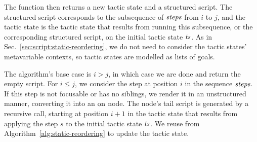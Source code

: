 The  function then returns a new tactic state and a structured script.
The structured script corresponds to the subsequence of ${\operatorname{\mathit{steps}}}$ from $i$ to $j$, and the tactic state is the tactic state that results from running this subsequence, or the corresponding structured script, on the initial tactic state ${\operatorname{\mathit{ts}}}$.
As in Sec.~\ref{sec:script:static-reordering}, we do not need to consider the tactic states' metavariable contexts, so tactic states are modelled as lists of goals.

\begin{algorithm}
  \BlankLine
  \BlankLine
  \caption{Conversion of a sequence of steps to a structured script}%
  \label{alg:sscript}
\end{algorithm}

The algorithm's base case is $i > j$, in which case we are done and return the empty script.
For $i ≤ j$, we consider the step at position $i$ in the sequence ${\operatorname{\mathit{steps}}}$.
If this step is not focusable or has no siblings, we render it in an unstructured manner, converting it into an ${\operatorname{on}}$ node.
The node's tail script is generated by a recursive call, starting at position $i + 1$ in the tactic state that results from applying the step $s$ to the initial tactic state ${\operatorname{\mathit{ts}}}$.
We reuse  from Algorithm~\ref{alg:static-reordering} to update the tactic state.

